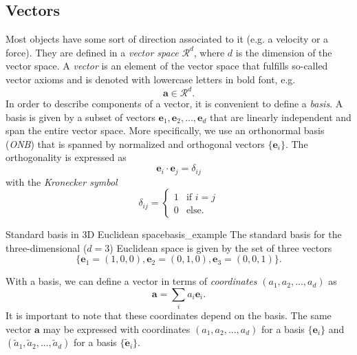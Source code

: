 \subsection{Vectors}
Most objects have some sort of direction associated to it (e.g. a velocity or a force). They are defined in a \emph{vector space} 
$\mathcal{R}^d$, where $d$ is the dimension of the vector space. A \emph{vector} is an element of the vector space that fulfills so-called vector axioms and is denoted with lowercase letters in bold font, e.g. 
\begin{equation}
    \textbf{a} \in \mathcal{R}^d.
\end{equation}
In order to describe components of a vector, it is convenient to define a \emph{basis}. A basis is given by a subset of vectors ${\mathbf{e}_1,\mathbf{e}_2,...,\mathbf{e}_d}$ that are linearly independent and span the entire vector space.
More specifically, we use an orthonormal basis (\emph{ONB}) that is spanned by normalized and orthogonal vectors $\{\mathbf{e}_i\}$. The orthogonality is expressed as  
\begin{equation}
    \label{eq:orthogonality}
    \mathbf{e}_i \cdot \mathbf{e}_j = \delta_{ij}
\end{equation}
with the \emph{Kronecker symbol} 
\begin{equation}
    \delta_{ij} = 
    \begin{cases}
    1 & \text{if }  i=j \\
    0 & \text{else}.
    \end{cases}
\end{equation}

\begin{example}{Standard basis in 3D Euclidean space}{basis_example}
    The standard basis for the three-dimensional ($d=3$) Euclidean space is given by the set of three vectors
    \begin{equation}
        \{\mathbf{e}_1=(1,0,0), \mathbf{e}_2=(0,1,0), \mathbf{e}_3=(0,0,1)\}.
    \end{equation}
\end{example}

With a basis, we can define a vector in terms of \emph{coordinates} $(a_1, a_2, ..., a_d)$ as 
\begin{equation}
    \label{eq:coordinates}
    \mathbf{a} = \sum_i a_i \mathbf{e}_i. 
\end{equation}
It is important to note that these coordinates depend on the basis. The same vector $\mathbf{a}$ may be expressed with coordinates $(a_1, a_2, ..., a_d)$ for a basis $\{\mathbf{e}_i\}$ and $(\tilde{a}_1, \tilde{a}_2, ..., \tilde{a}_d)$ for a basis $\{\tilde{\mathbf{e}}_i\}$. 

